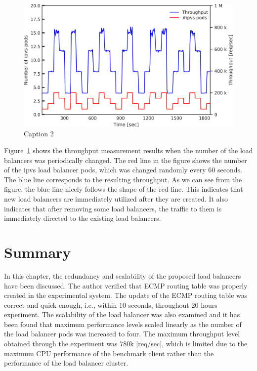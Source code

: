 \begin{figure}[t]
  \includegraphics[width=0.98\columnwidth,left]{Figs/ecmp_response}
  \caption{Caption 2}
  \label{fig:ecmp_response}
\end{figure}

Figure~\ref{fig:ecmp_response} shows the throughput measurement results when the number of the load balancers was periodically changed. 
The red line in the figure shows the number of the ipvs load balancer pods, which was changed randomly every 60 seconds.
The blue line corresponds to the resulting throughput.
As we can see from the figure, the blue line nicely follows the shape of the red line.
This indicates that new load balancers are immediately utilized after they are created.
It also indicates that after removing some load balancers, the traffic to them is immediately directed to the existing load balancers.

\FloatBarrier

\section{Summary}

In this chapter, the redundancy and scalability of the proposed load balancers have been discussed.
The author verified that ECMP routing table was properly created in the experimental system.
The update of the ECMP routing table was correct and quick enough, i.e., within 10 seconds, throughout 20 hours experiment.
The scalability of the load balancer was also examined and it has been found that maximum performance levels scaled linearly as the number of the load balancer pods was increased to four.
The maximum throughput level obtained through the experiment was 780k [req/sec], which is limited due to the maximum CPU performance of the benchmark client rather than the performance of the load balancer cluster.


